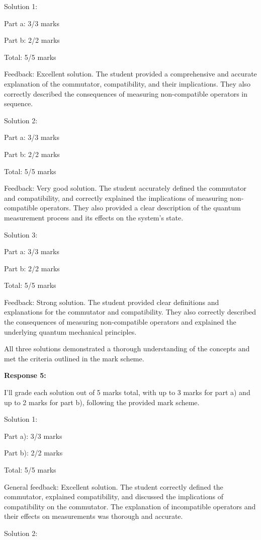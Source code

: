 \documentclass[a4paper,11pt]{article}
\begin{document}
Solution 1:

Part a: 3/3 marks

Part b: 2/2 marks

Total: 5/5 marks

Feedback: Excellent solution. The student provided a comprehensive and accurate explanation of the commutator, compatibility, and their implications. They also correctly described the consequences of measuring non-compatible operators in sequence.

Solution 2:

Part a: 3/3 marks

Part b: 2/2 marks

Total: 5/5 marks

Feedback: Very good solution. The student accurately defined the commutator and compatibility, and correctly explained the implications of measuring non-compatible operators. They also provided a clear description of the quantum measurement process and its effects on the system's state.

Solution 3:

Part a: 3/3 marks

Part b: 2/2 marks

Total: 5/5 marks

Feedback: Strong solution. The student provided clear definitions and explanations for the commutator and compatibility. They also correctly described the consequences of measuring non-compatible operators and explained the underlying quantum mechanical principles.

All three solutions demonstrated a thorough understanding of the concepts and met the criteria outlined in the mark scheme.

\bigskip
\textbf{Response 5:}

I'll grade each solution out of 5 marks total, with up to 3 marks for part a) and up to 2 marks for part b), following the provided mark scheme.

Solution 1:

Part a): 3/3 marks

Part b): 2/2 marks

Total: 5/5 marks

General feedback: Excellent solution. The student correctly defined the commutator, explained compatibility, and discussed the implications of compatibility on the commutator. The explanation of incompatible operators and their effects on measurements was thorough and accurate.

Solution 2:
\end{document}
